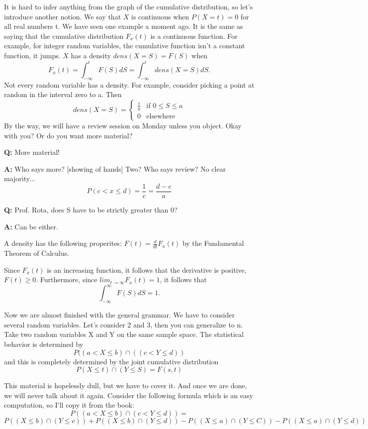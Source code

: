 It is hard to infer anything from the graph of the cumulative distribution, so let's
introduce another notion.
We say that $X$ is continuous when $P(X=t)=0$ for all real numbers t. We
have seen one example a moment ago.  It is the same as saying that the
cumulative distribution $F_{x}(t)$ is a continuous function. For example,
for integer random variables, the cumulative function isn't a constant
function, it jumps.
$X$ has a density $dens(X=S)=F(S)$ when \[F_{x}(t)=
\int_{-\infty}^{t} F(S) dS =
\int_{-\infty}^{t} dens(X=S) dS.\]
Not every random variable has a density.
For example, consider picking a point at random in the interval zero to
a. Then
\[ dens(X=S) =\left\{ \begin{array}{rcl} \frac{1}{a} & \mbox{if $0 \leq S \leq a$}\\
 0 & \mbox{elsewhere}\end{array} \right. \]
By the way, we will have a review session on Monday unless you
object. Okay with you? Or do you want more material?

{\bf Q:} More material!

{\bf A:} Who says more? [showing of hands] Two? Who says review? No clear majority...
\[ P(c<x \leq d) = \frac{1}{c} = \frac{d-c}{a} \]


{\bf Q:} Prof. Rota, does S have to be strictly greater than 0?

{\bf A:} Can be either.

A density has the following properites: $F(t)= \frac{d}{dt} F_{x}(t)$ by the
Fundamental Theorem of Calculus.

Since $F_{x}(t)$ is an increasing function, it follows that the derivative
is positive, $F(t) \geq 0.$
Furthermore, since $ lim_{t \rightarrow \infty} F_{x}(t)=1$, it follows that
\[\int_{-\infty}^{\infty} F(S) dS=1.\]

Now we are almost finished with the general grammar. 
We have to consider several random variables.
Let's consider 2 and 3, then you can generalize to n.
Take two random variables X and Y on the same sample space. The
statistical behavior is determined by \[P((a<X\leq b) \cap ((c<Y\leq d))\] and
this is completely determined by the joint cumulative distribution \[P(X
\leq t) \cap (Y\leq S) = F(s,t)\]

This material is hopelessly dull, but we have to cover it. And once we are done, we will never talk about it again.
Consider the following formula which is an easy computation, so I'll copy it from the book:
\[P((a<X\leq b) \cap (c<Y\leq d)) = \] \[P((X\leq b) \cap (Y\leq
c)) + P((X\leq b) \cap (Y\leq d)) - P((X\leq a) \cap (Y\leq C)) -
P((X\leq a) \cap (Y\leq d))\]

